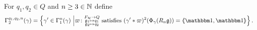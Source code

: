 \documentclass[a4paper,11pt]{amsart}
\begin{document}
For $q_1,q_2 \in Q$ and $n\geq3\in \mathbb{N}$ define
\[\Gamma_2^{q_1,q_2,n}(\gamma) = \left\{\gamma'\in \Gamma_1^n(\gamma) \bigmid
\varpi\colon \substack{F_{\mathcal{H}}\to Q\\
      \mathfrak g_1\mapsto q_1 \\
      \mathfrak g_2\mapsto q_2 }\text{ satisfies }
    (\gamma'*\varpi)^2(\Phi_\gamma(R_n \mathfrak g))=\pair{\id,\id}\right\}.\]
\end{document}
